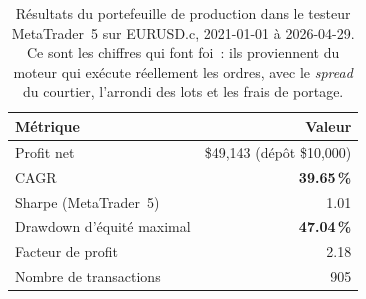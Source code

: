 \begin{table}[H]
\centering
\caption{Résultats du portefeuille de production dans le testeur MetaTrader~5 sur EURUSD.c, 2021-01-01 à 2026-04-29. Ce sont les chiffres qui font foi~: ils proviennent du moteur qui exécute réellement les ordres, avec le \emph{spread} du courtier, l'arrondi des lots et les frais de portage.}
\label{tab:mt5_reference}
\begin{tabular}{lr}
\toprule
Métrique & Valeur \\
\midrule
Profit net & \$49,143 (dépôt \$10,000) \\
CAGR & \textbf{39.65\,\%} \\
Sharpe (MetaTrader~5) & 1.01 \\
Drawdown d'équité maximal & \textbf{47.04\,\%} \\
Facteur de profit & 2.18 \\
Nombre de transactions & 905 \\
\bottomrule
\end{tabular}
\end{table}
